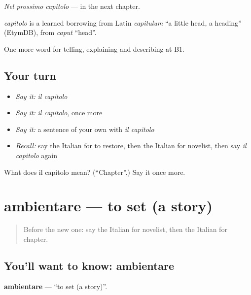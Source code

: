 \emph{Nel prossimo capitolo} — in the next chapter.

\begin{cousinweb}
\emph{capitolo} is a learned borrowing from Latin \emph{capitulum} \textquotedblleft{}a little head, a heading\textquotedblright{} (EtymDB), from \emph{caput} \textquotedblleft{}head\textquotedblright{}.
\end{cousinweb}

\begin{grammarlens}[title={What you've built}]
One more word for telling, explaining and describing at B1.
\end{grammarlens}

\subsection*{Your turn}
\begin{itemize}
\raggedright
  \item \emph{Say it:} \emph{il capitolo}
  \item \emph{Say it:} \emph{il capitolo}, once more
  \item \emph{Say it:} a sentence of your own with \emph{il capitolo}
  \item \emph{Recall:} say the Italian for to restore, then the Italian for novelist, then say \emph{il capitolo} again
\end{itemize}

\begin{tcolorbox}[breakable,colback=teal!4,colframe=teal!35!black,title={Before you move on}]
What does il capitolo mean? (\textquotedblleft{}Chapter\textquotedblright{}.) Say it once more.
\end{tcolorbox}
\section[ambientare]{ambientare — to set (a story)}

\label{lesson:IT-C524-ambientare}



\begin{quote}
Before the new one: say the Italian for novelist, then the Italian for chapter.
\end{quote}

\subsection*{You'll want to know: ambientare}
\textbf{ambientare} — \textquotedblleft{}to set (a story)\textquotedblright{}.

